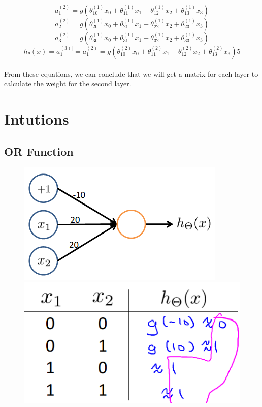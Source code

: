 \documentclass[12pt]{report}
\begin{document}
  \begin{equation}
    a_1^{(2)} = g(\theta_{10}^{(1)}x_0 + \theta_{11}^{(1)}x_1 + \theta_{12}^{(1)}x_2 + \theta_{13}^{(1)}x_3)
  \end{equation}
  \begin{equation}
    a_2^{(2)} = g(\theta_{20}^{(1)}x_0 + \theta_{21}^{(1)}x_1 + \theta_{22}^{(1)}x_2 + \theta_{23}^{(1)}x_3)
  \end{equation}
  \begin{equation}
    a_3^{(2)} = g(\theta_{30}^{(1)}x_0 + \theta_{31}^{(1)}x_1 + \theta_{32}^{(1)}x_2 + \theta_{33}^{(1)}x_3)
  \end{equation}
  \begin{equation}
    h_\theta(x) = a_1^{(3)]} = a_1^{(2)} = g(\theta_{10}^{(2)}x_0 + \theta_{11}^{(2)}x_1 + \theta_{12}^{(2)}x_2 + \theta_{13}^{(2)}x_3)5
  \end{equation}
  \\From these equations, we can conclude that we will get a matrix for each layer to calculate the weight for the second layer.

  \section{Intutions}
    \subsection{OR Function}
      \begin{figure}[h]
        \centering
        \includegraphics[scale=0.5]{ornet.png}
        \includegraphics[scale=0.4]{ortable.png}
      \end{figure}
\end{document}

